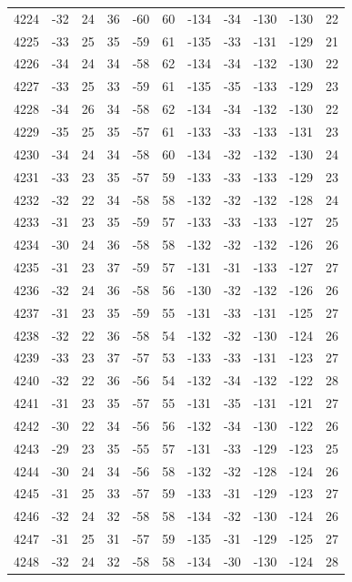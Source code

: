 \begin{table}[H]
\begin{tabular}{lllllllllll}
4224 & -32 & 24 & 36 & -60 & 60 & -134 & -34 & -130 & -130 & 22 \\
4225 & -33 & 25 & 35 & -59 & 61 & -135 & -33 & -131 & -129 & 21 \\
4226 & -34 & 24 & 34 & -58 & 62 & -134 & -34 & -132 & -130 & 22 \\
4227 & -33 & 25 & 33 & -59 & 61 & -135 & -35 & -133 & -129 & 23 \\
4228 & -34 & 26 & 34 & -58 & 62 & -134 & -34 & -132 & -130 & 22 \\
4229 & -35 & 25 & 35 & -57 & 61 & -133 & -33 & -133 & -131 & 23 \\
4230 & -34 & 24 & 34 & -58 & 60 & -134 & -32 & -132 & -130 & 24 \\
4231 & -33 & 23 & 35 & -57 & 59 & -133 & -33 & -133 & -129 & 23 \\
4232 & -32 & 22 & 34 & -58 & 58 & -132 & -32 & -132 & -128 & 24 \\
4233 & -31 & 23 & 35 & -59 & 57 & -133 & -33 & -133 & -127 & 25 \\
4234 & -30 & 24 & 36 & -58 & 58 & -132 & -32 & -132 & -126 & 26 \\
4235 & -31 & 23 & 37 & -59 & 57 & -131 & -31 & -133 & -127 & 27 \\
4236 & -32 & 24 & 36 & -58 & 56 & -130 & -32 & -132 & -126 & 26 \\
4237 & -31 & 23 & 35 & -59 & 55 & -131 & -33 & -131 & -125 & 27 \\
4238 & -32 & 22 & 36 & -58 & 54 & -132 & -32 & -130 & -124 & 26 \\
4239 & -33 & 23 & 37 & -57 & 53 & -133 & -33 & -131 & -123 & 27 \\
4240 & -32 & 22 & 36 & -56 & 54 & -132 & -34 & -132 & -122 & 28 \\
4241 & -31 & 23 & 35 & -57 & 55 & -131 & -35 & -131 & -121 & 27 \\
4242 & -30 & 22 & 34 & -56 & 56 & -132 & -34 & -130 & -122 & 26 \\
4243 & -29 & 23 & 35 & -55 & 57 & -131 & -33 & -129 & -123 & 25 \\
4244 & -30 & 24 & 34 & -56 & 58 & -132 & -32 & -128 & -124 & 26 \\
4245 & -31 & 25 & 33 & -57 & 59 & -133 & -31 & -129 & -123 & 27 \\
4246 & -32 & 24 & 32 & -58 & 58 & -134 & -32 & -130 & -124 & 26 \\
4247 & -31 & 25 & 31 & -57 & 59 & -135 & -31 & -129 & -125 & 27 \\
4248 & -32 & 24 & 32 & -58 & 58 & -134 & -30 & -130 & -124 & 28 \\

\end{tabular}
\end{table}
